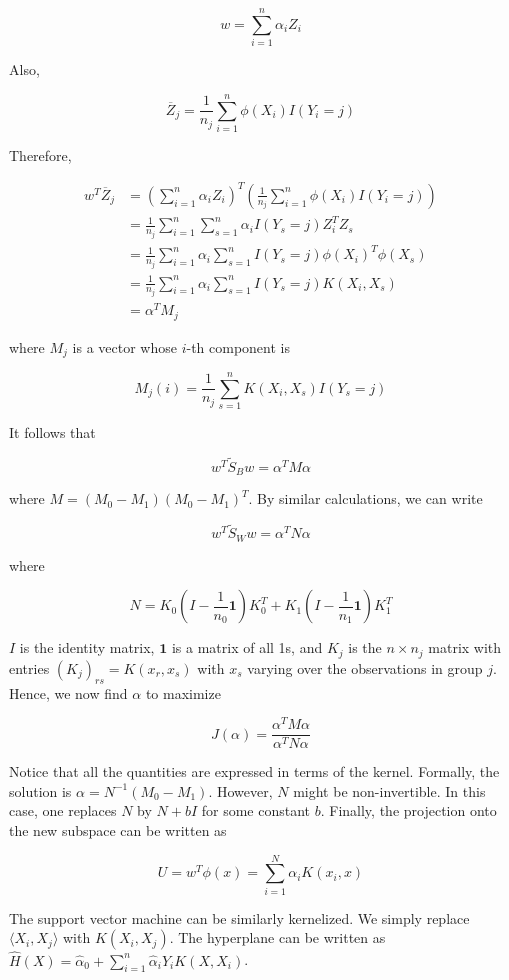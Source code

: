 \[ w = \sum_{i=1}^n \alpha_i Z_i \]

Also,

\[ \overline{Z}_j = \frac{1}{n_j} \sum_{i=1}^n \phi(X_i) I(Y_i = j) \]

Therefore,

\[
\begin{align}
w^T \overline{Z}_j &= \left( \sum_{i=1}^n \alpha_i Z_i \right)^T \left( \frac{1}{n_j} \sum_{i=1}^n \phi(X_i) I(Y_i = j) \right) \\
&= \frac{1}{n_j} \sum_{i=1}^n \sum_{s=1}^n \alpha_i I(Y_s = j) Z_i^T Z_s \\
&= \frac{1}{n_j} \sum_{i=1}^n \alpha_i \sum_{s=1}^n I(Y_s = j) \phi(X_i)^T \phi(X_s) \\
&= \frac{1}{n_j} \sum_{i=1}^n \alpha_i \sum_{s=1}^n I(Y_s = j) K(X_i, X_s) \\
&= \alpha^T M_j
\end{align}
\]

where \(M_j\) is a vector whose \(i\)-th component is

\[ M_j(i) = \frac{1}{n_j} \sum_{s=1}^n K(X_i, X_s) I(Y_s = j) \]

It follows that

\[ w^T \tilde{S}_B w = \alpha^T M \alpha \]

where \(M = (M_0 - M_1)(M_0 - M_1)^T\). By similar calculations, we can
write

\[ w^T \tilde{S}_W w = \alpha^T N \alpha \]

where

\[ N = K_0\left( I - \frac{1}{n_0}\mathbf{1}\right) K_0^T + K_1\left( I - \frac{1}{n_1}\mathbf{1}\right) K_1^T\]

\(I\) is the identity matrix, \(\mathbf{1}\) is a matrix of all 1s, and
\(K_j\) is the \(n \times n_j\) matrix with entries
\((K_j)_{rs} = K(x_r, x_s)\) with \(x_s\) varying over the observations
in group \(j\). Hence, we now find \(\alpha\) to maximize

\[ J(\alpha) = \frac{\alpha^T M \alpha}{\alpha^T N \alpha} \]

Notice that all the quantities are expressed in terms of the kernel.
Formally, the solution is \(\alpha = N^{-1}(M_0 - M_1)\). However, \(N\)
might be non-invertible. In this case, one replaces \(N\) by \(N + bI\)
for some constant \(b\). Finally, the projection onto the new subspace
can be written as

\[ U = w^T \phi(x) = \sum_{i=1}^N \alpha_i K(x_i, x) \]

The support vector machine can be similarly kernelized. We simply
replace \(\langle X_i, X_j \rangle\) with \(K(X_i, X_j)\). The
hyperplane can be written as
\(\hat{H}(X) = \hat{\alpha}_0 + \sum_{i=1}^n \hat{\alpha}_i Y_i K(X, X_i)\).

